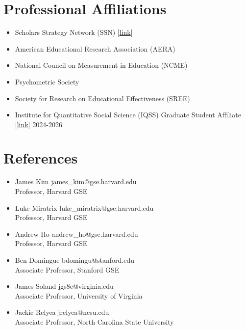 \documentclass[11pt]{article}
\begin{document}
\section{Professional Affiliations}

\begin{itemize}
    \item Scholars Strategy Network (SSN) [\href{https://scholars.org/scholar/joshua-baer-gilbert}{link}]
    \item American Educational Research Association (AERA)
    \item National Council on Measurement in Education (NCME)
    \item Psychometric Society
    \item Society for Research on Educational Effectiveness (SREE)
    \item Institute for Quantitative Social Science (IQSS) Graduate Student Affiliate [\href{https://www.iq.harvard.edu/people/joshua-gilbert}{link}] \hfill 2024-2026
\end{itemize}

\section{References}

\begin{itemize}
    \item James Kim \hfill james\_kim@gse.harvard.edu \\ Professor, Harvard GSE
    \item Luke Miratrix \hfill luke\_miratrix@gse.harvard.edu \\ Professor, Harvard GSE
    \item Andrew Ho \hfill andrew\_ho@gse.harvard.edu \\ Professor, Harvard GSE
    \item Ben Domingue \hfill bdomingu@stanford.edu \\ Associate Professor, Stanford GSE
    \item James Soland \hfill jgs8e@virginia.edu \\ Associate Professor, University of Virginia
    \item Jackie Relyea \hfill jrelyea@ncsu.edu \\ Associate Professor, North Carolina State University
\end{itemize}
\end{document}
